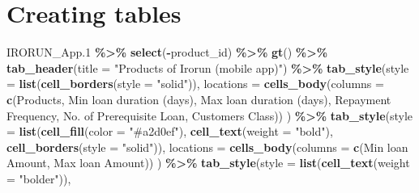 \documentclass[
]{article}
\newenvironment{Shaded}{\begin{snugshade}}{\end{snugshade}}
\newcommand{\AttributeTok}[1]{\textcolor[rgb]{0.13,0.29,0.53}{#1}}
\newcommand{\FloatTok}[1]{\textcolor[rgb]{0.00,0.00,0.81}{#1}}
\newcommand{\FunctionTok}[1]{\textcolor[rgb]{0.13,0.29,0.53}{\textbf{#1}}}
\newcommand{\NormalTok}[1]{#1}
\newcommand{\SpecialCharTok}[1]{\textcolor[rgb]{0.81,0.36,0.00}{\textbf{#1}}}
\newcommand{\StringTok}[1]{\textcolor[rgb]{0.31,0.60,0.02}{#1}}
\begin{document}
\hypertarget{creating-tables}{%
\section{Creating tables}\label{creating-tables}}

\begin{Shaded}
\begin{Highlighting}[]
\NormalTok{IRORUN\_App}\FloatTok{.1} \SpecialCharTok{\%\textgreater{}\%}
  \FunctionTok{select}\NormalTok{(}\SpecialCharTok{{-}}\NormalTok{product\_id) }\SpecialCharTok{\%\textgreater{}\%} \FunctionTok{gt}\NormalTok{() }\SpecialCharTok{\%\textgreater{}\%} 
  \FunctionTok{tab\_header}\NormalTok{(}\AttributeTok{title =} \StringTok{"Products of Irorun (mobile app)"}\NormalTok{) }\SpecialCharTok{\%\textgreater{}\%} 
  \FunctionTok{tab\_style}\NormalTok{(}\AttributeTok{style =} \FunctionTok{list}\NormalTok{(}\FunctionTok{cell\_borders}\NormalTok{(}\AttributeTok{style =} \StringTok{"solid"}\NormalTok{)),}
            \AttributeTok{locations =} \FunctionTok{cells\_body}\NormalTok{(}\AttributeTok{columns =} \FunctionTok{c}\NormalTok{(Products, }\StringTok{\textasciigrave{}}\AttributeTok{Min loan duration (days)}\StringTok{\textasciigrave{}}\NormalTok{, }\StringTok{\textasciigrave{}}\AttributeTok{Max loan duration (days)}\StringTok{\textasciigrave{}}\NormalTok{, }\StringTok{\textasciigrave{}}\AttributeTok{Repayment Frequency}\StringTok{\textasciigrave{}}\NormalTok{, }\StringTok{\textasciigrave{}}\AttributeTok{No. of Prerequisite Loan}\StringTok{\textasciigrave{}}\NormalTok{, }\StringTok{\textasciigrave{}}\AttributeTok{Customer\textquotesingle{}s Class}\StringTok{\textasciigrave{}}\NormalTok{))}
\NormalTok{            ) }\SpecialCharTok{\%\textgreater{}\%} 
  \FunctionTok{tab\_style}\NormalTok{(}\AttributeTok{style =} \FunctionTok{list}\NormalTok{(}\FunctionTok{cell\_fill}\NormalTok{(}\AttributeTok{color =} \StringTok{"\#a2d0ef"}\NormalTok{), }
                         \FunctionTok{cell\_text}\NormalTok{(}\AttributeTok{weight =} \StringTok{"bold"}\NormalTok{), }\FunctionTok{cell\_borders}\NormalTok{(}\AttributeTok{style =} \StringTok{"solid"}\NormalTok{)),}
            \AttributeTok{locations =} \FunctionTok{cells\_body}\NormalTok{(}\AttributeTok{columns =} \FunctionTok{c}\NormalTok{(}\StringTok{\textasciigrave{}}\AttributeTok{Min loan Amount}\StringTok{\textasciigrave{}}\NormalTok{, }\StringTok{\textasciigrave{}}\AttributeTok{Max loan Amount}\StringTok{\textasciigrave{}}\NormalTok{))}
\NormalTok{            ) }\SpecialCharTok{\%\textgreater{}\%} 
  \FunctionTok{tab\_style}\NormalTok{(}\AttributeTok{style =} \FunctionTok{list}\NormalTok{(}\FunctionTok{cell\_text}\NormalTok{(}\AttributeTok{weight =} \StringTok{"bolder"}\NormalTok{)),}

\end{Highlighting}
\end{Shaded}
\end{document}
